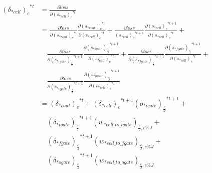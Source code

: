 \documentclass[runningheads,openany]{xhlPaper}
\begin{document}
\begin{equation}
\begin{aligned}
{\left( {{\delta _{*cell}}} \right)_c}^{*t} &= \frac{{\partial loss}}{{\partial {{\left( {{s_{*cell}}} \right)}_c}^{*t}}}\\
 &= \frac{{\partial loss}}{{\partial {{\left( {{s_{*cout}}} \right)}_c}^{*t}}}\frac{{\partial {{\left( {{s_{*cout}}} \right)}_c}^{*t}}}{{\partial {{\left( {{s_{*cell}}} \right)}_c}^{*t}}} + \frac{{\partial loss}}{{{{\left( {{s_{*cell}}} \right)}_c}^{*t + 1}}}\frac{{\partial {{\left( {{s_{*cell}}} \right)}_c}^{*t + 1}}}{{\partial {{\left( {{s_{*cell}}} \right)}_c}^{*t}}} + \\
&\quad\frac{{\partial loss}}{{\partial {{\left( {{s_{*igate}}} \right)}_{\frac{c}{J}}}^{*t + 1}}}\frac{{\partial {{\left( {{s_{*igate}}} \right)}_{\frac{c}{J}}}^{*t + 1}}}{{\partial {{\left( {{s_{*cell}}} \right)}_c}^{*t}}} + \frac{{\partial loss}}{{\partial {{\left( {{s_{*fgate}}} \right)}_{\frac{c}{J}}}^{*t + 1}}}\frac{{\partial {{\left( {{s_{*fgate}}} \right)}_{\frac{c}{J}}}^{*t + 1}}}{{\partial {{\left( {{s_{*cell}}} \right)}_c}^{*t}}} + \\
&\quad\frac{{\partial loss}}{{\partial {{\left( {{s_{*ogate}}} \right)}_{\frac{c}{J}}}^{*t + 1}}}\frac{{\partial {{\left( {{s_{*ogate}}} \right)}_{\frac{c}{J}}}^{*t + 1}}}{{\partial {{\left( {{s_{*cell}}} \right)}_c}^{*t}}}\\
 &= {\left( {{\delta _{*cout}}} \right)_c}^{*t} + {\left( {{\delta _{*cell}}} \right)_c}^{*t + 1}{\left( {{o_{*igate}}} \right)_{\frac{c}{J}}}^{*t + 1} + \\
&\quad{\left( {{\delta _{*igate}}} \right)_{\frac{c}{J}}}^{*t + 1}{\left( {{w_{*cell\_to\_igate}}} \right)_{\frac{c}{J},c\% J}} + \\
&\quad{\left( {{\delta _{*fgate}}} \right)_{\frac{c}{J}}}^{*t + 1}{\left( {{w_{*cell\_to\_fgate}}} \right)_{\frac{c}{J},c\% J}} + \\
&\quad{\left( {{\delta _{*ogate}}} \right)_{\frac{c}{J}}}^{*t + 1}{\left( {{w_{*cell\_to\_ogate}}} \right)_{\frac{c}{J},c\% J}}
\end{aligned}
\end{equation}
\end{document}
